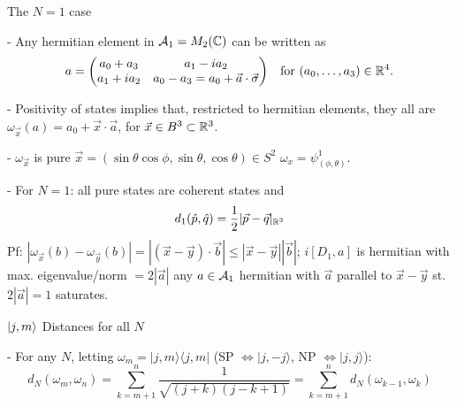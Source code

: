 \begin{frame}{The $N = 1$ case} %

- Any hermitian element in $\mathcal A_1 = M_2(\mathbb C)$ can be written as
\begin{align}
    a &= \begin{pmatrix} a_0 + a_3 & a_1 - i a_2 \\ a_1 + i a_2 & a_0 - a_3 = a_0 + \vec a \cdot \vec \sigma \end{pmatrix} & \text{for $(a_0, \dots, a_3) \in \mathbb R^4$.}
\end{align}


- Positivity of states implies that, restricted to hermitian elements, they all are  $\omega_{\vec x}(a) = a_0 + \vec x \cdot \vec a$, for $\vec x \in B^3 \subset \mathbb R^3$.

- $\omega_{\vec x}$ is pure \iff $\vec x = (\sin \theta \cos \phi, \sin \theta, \cos \theta) \in S^2$ \iff $\omega_x = \psi^1_{(\phi, \theta)}$.

- For $N = 1$: all pure states are coherent states and 
\begin{equation}
    d_1(\hat p, \hat q) = \frac{1}{2}|\vec p - \vec q|_{\mathbb R^3}
\end{equation}
Pf: $|\omega_{\vec x}(b) - \omega_{\vec y}(b)| = |(\vec x - \vec y)\cdot \vec b| \leq |\vec x - \vec y||\vec b|$; $i[D_1, a]$ is hermitian with max. eigenvalue/norm $=2 |\vec a|$ \then any $a \in \mathcal A_1$ hermitian with $\vec a$ parallel to $\vec x - \vec y$ st. $2|\vec a| = 1$ saturates.

\end{frame}

\begin{frame}{$|j, m\rangle$ Distances for all $N$} %

- For any $N$, letting $\omega_m = |j, m\rangle \langle j, m|$ (SP $\Longleftrightarrow |j, -j\rangle$, NP $\Longleftrightarrow |j, j\rangle$):
\begin{equation}
    d_N(\omega_m, \omega_n) = \sum_{k = m+1}^n \frac{1}{\sqrt{(j+k)(j-k+1)}} = \sum_{k = m+1}^n d_N(\omega_{k-1}, \omega_k)
\end{equation}

\end{frame}


